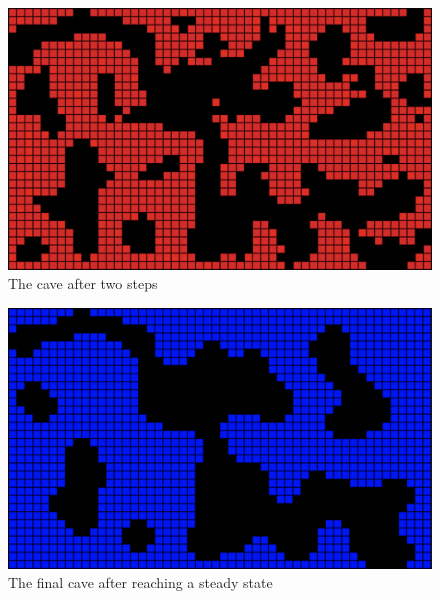 \documentclass[a4paper, 12pt]{article}
\begin{document}
\begin{figure}[h]
	\centering
	\includegraphics[width=\textwidth]{two-step-cave.png}
	\caption{The cave after two steps}
	\label{fig:twoStepCave}
\end{figure}

\begin{figure}[h]
	\centering
	\includegraphics[width=\textwidth]{final-cave.png}
	\caption{The final cave after reaching a steady state}
	\label{fig:finalCave}
\end{figure}

\clearpage

\printbibliography
\end{document}

